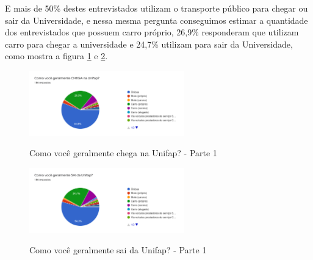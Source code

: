 E mais de 50\% destes entrevistados utilizam o transporte público para chegar ou sair da Universidade, e nessa mesma pergunta conseguimos estimar a quantidade dos entrevistados que possuem carro próprio, 26,9\% responderam que utilizam carro para chegar a universidade e 24,7\% utilizam para sair da Universidade, como mostra a figura \ref{fig:chegadanaunifap1} e \ref{fig:saidadaunifap1}.

\begin{figure}[!hbtp]
	\centering
	\caption{Como você geralmente chega na Unifap? -  Parte 1}
	\includegraphics[width=0.6\textwidth]{./04-figuras/questionario/7.png}
	\label{fig:chegadanaunifap1}
\end{figure}

\begin{figure}[!hbtp]
	\centering
	\caption{Como você geralmente sai da Unifap? - Parte 1}
	\includegraphics[width=0.6\textwidth]{./04-figuras/questionario/9.png}
	\label{fig:saidadaunifap1}
\end{figure}

